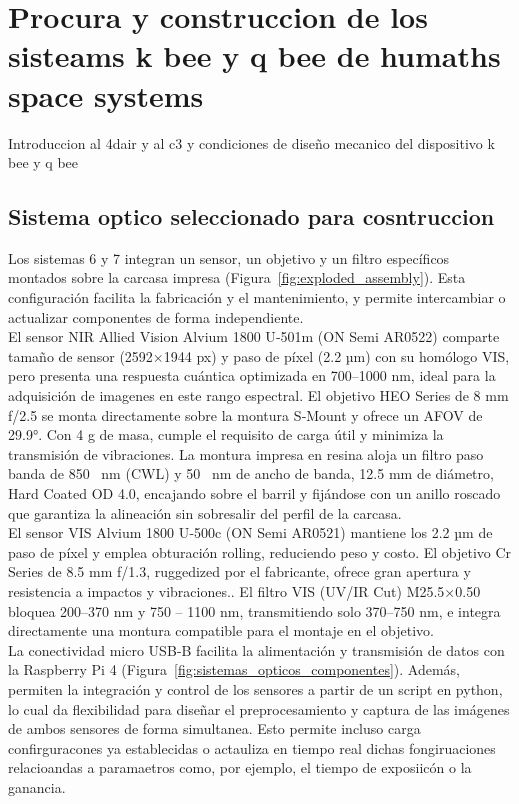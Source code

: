 \chapter{Procura y construccion de los sisteams k bee y q bee de humaths space systems}   
Introduccion al 4dair y al c3 y condiciones de diseño mecanico del dispositivo k bee y q bee

\section{Sistema optico seleccionado para cosntruccion}
\noindent Los sistemas 6 y 7 integran un sensor, un objetivo y un filtro específicos montados sobre la carcasa impresa (Figura~\ref{fig:exploded_assembly}). Esta configuración facilita la fabricación y el mantenimiento, y permite intercambiar o actualizar componentes de forma independiente.\\

\noindent El sensor NIR Allied Vision Alvium 1800 U‑501m (ON Semi AR0522) comparte tamaño de sensor (2592×1944 px) y paso de píxel (2.2 µm) con su homólogo VIS, pero presenta una respuesta cuántica optimizada en 700–1000 nm, ideal para la adquisición de imagenes en este rango espectral. El objetivo HEO Series de 8 mm f/2.5 se monta directamente sobre la montura S‑Mount y ofrece un AFOV de 29.9°. Con 4 g de masa, cumple el requisito de carga útil y minimiza la transmisión de vibraciones. La montura impresa en resina aloja un filtro paso banda de 850 \SI{}{nm} (CWL) y 50 \SI{}{nm} de ancho de banda, 12.5 mm de diámetro, Hard Coated OD 4.0, encajando sobre el barril y fijándose con un anillo roscado que garantiza la alineación sin sobresalir del perfil de la carcasa.\\

\noindent El sensor VIS Alvium 1800 U‑500c (ON Semi AR0521) mantiene los 2.2 µm de paso de píxel y emplea obturación rolling, reduciendo peso y costo. El objetivo Cr Series de 8.5 mm f/1.3, ruggedized por el fabricante, ofrece gran apertura y resistencia a impactos y vibraciones.. El filtro VIS (UV/IR Cut) M25.5×0.50 bloquea 200–370 nm y 750 – 1100 nm, transmitiendo solo 370–750 nm, e integra directamente una montura compatible para el montaje en el objetivo.\\

\noindent La conectividad micro USB‑B facilita la alimentación y transmisión de datos con la Raspberry Pi 4 (Figura~\ref{fig:sistemas_opticos_componentes}). Además, permiten la integración y control de los sensores a partir de un script en python, lo cual da flexibilidad para diseñar el preprocesamiento y captura de las imágenes de ambos sensores de forma simultanea. Esto permite incluso carga confirguracones ya establecidas o actauliza en tiempo real dichas fongiruaciones relacioandas a paramaetros como, por ejemplo, el tiempo de exposiicón o la ganancia.

